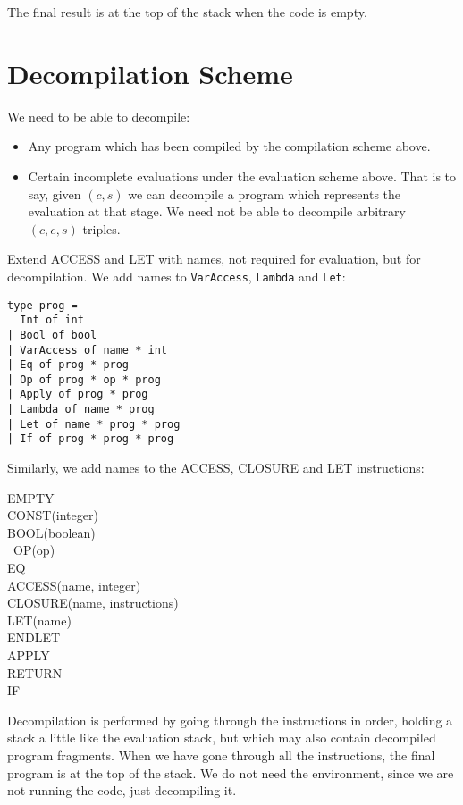 \documentclass[11pt]{article}
\begin{document}
\bigskip

\noindent The final result is at the top of the stack when the code is empty.

\section{Decompilation Scheme}

We need to be able to decompile:

\begin{itemize}
\item Any program which has been compiled by the compilation scheme above.
\item Certain incomplete evaluations under the evaluation scheme above. That is to say, given $(c, s)$ we can decompile a program which represents the evaluation at that stage. We need not be able to decompile arbitrary $(c, e, s)$ triples.
\end{itemize}

\noindent Extend ACCESS and LET with names, not required for evaluation, but for decompilation. We add names to \texttt{VarAccess}, \texttt{Lambda} and \texttt{Let}:

\begin{verbatim}
type prog =
  Int of int
| Bool of bool
| VarAccess of name * int
| Eq of prog * prog
| Op of prog * op * prog
| Apply of prog * prog
| Lambda of name * prog
| Let of name * prog * prog
| If of prog * prog * prog\end{verbatim}

\noindent Similarly, we add names to the ACCESS, CLOSURE and LET instructions:

\bigskip

\noindent
EMPTY\\
CONST(integer)\\
BOOL(boolean)\\\
OP(op)\\
EQ\\
ACCESS(name, integer)\\
CLOSURE(name, instructions)\\
LET(name)\\
ENDLET\\
APPLY\\
RETURN\\
IF
\medskip

\noindent Decompilation is performed by going through the instructions in order, holding a stack a little like the evaluation stack, but which may also contain decompiled program fragments. When we have gone through all the instructions, the final program is at the top of the stack. We do not need the environment, since we are not running the code, just decompiling it.
\end{document}
